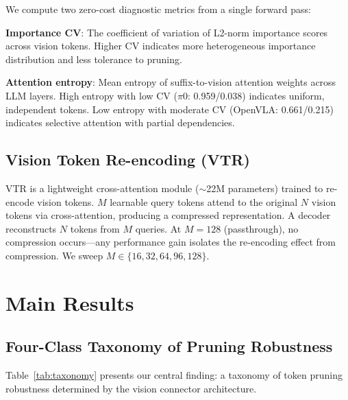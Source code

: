 \documentclass[letterpaper]{article}
\begin{document}
We compute two zero-cost diagnostic metrics from a single forward pass:

\textbf{Importance CV}: The coefficient of variation of L2-norm importance scores across vision tokens. Higher CV indicates more heterogeneous importance distribution and less tolerance to pruning.

\textbf{Attention entropy}: Mean entropy of suffix-to-vision attention weights across LLM layers. High entropy with low CV ($\pi$0: 0.959/0.038) indicates uniform, independent tokens. Low entropy with moderate CV (OpenVLA: 0.661/0.215) indicates selective attention with partial dependencies.

\subsection{Vision Token Re-encoding (VTR)}

VTR is a lightweight cross-attention module ($\sim$22M parameters) trained to re-encode vision tokens. $M$ learnable query tokens attend to the original $N$ vision tokens via cross-attention, producing a compressed representation. A decoder reconstructs $N$ tokens from $M$ queries. At $M{=}128$ (passthrough), no compression occurs---any performance gain isolates the re-encoding effect from compression. We sweep $M \in \{16, 32, 64, 96, 128\}$.

\section{Main Results}

\subsection{Four-Class Taxonomy of Pruning Robustness}

Table~\ref{tab:taxonomy} presents our central finding: a taxonomy of token pruning robustness determined by the vision connector architecture.
\end{document}
